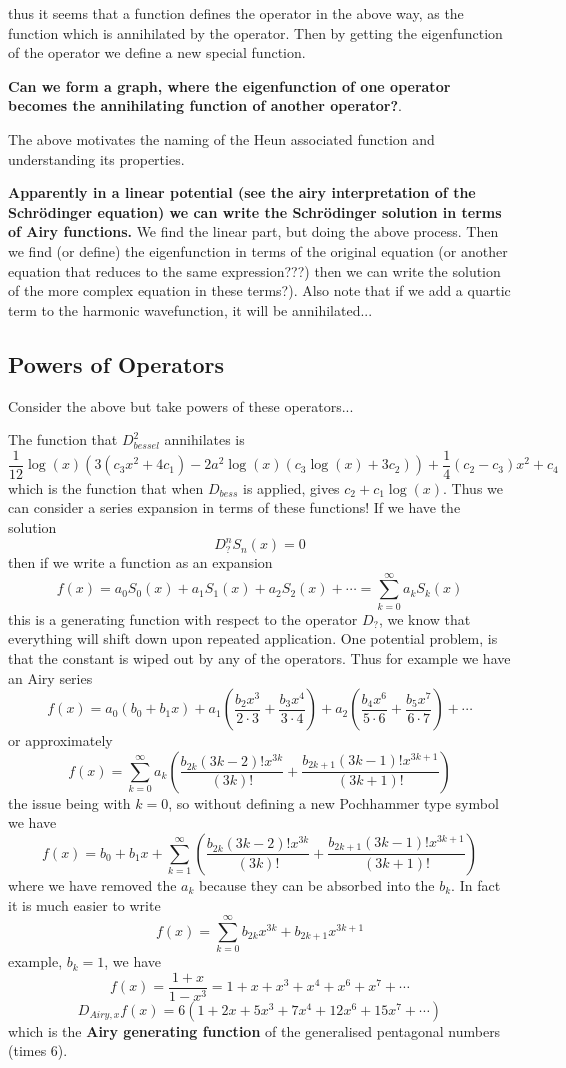 \documentclass{article}
\begin{document}
thus it seems that a function defines the operator in the above way, as the function which is annihilated by the operator. Then by getting the eigenfunction of the operator we define a new special function.

\textbf{Can we form a graph, where the eigenfunction of one operator becomes the annihilating function of another operator?}.

The above motivates the naming of the Heun associated function and understanding its properties.

\textbf{Apparently in a linear potential (see the airy interpretation of the Schrödinger equation) we can write the Schrödinger solution in terms of Airy functions.} We find the linear part, but doing the above process. Then we find (or define) the eigenfunction in terms of the original equation (or another equation that reduces to the same expression???) then we can write the solution of the more complex equation in these terms?). Also note that if we add a quartic term to the harmonic wavefunction, it will be annihilated...

\subsection{Powers of Operators}
Consider the above but take powers of these operators...

The function that $D^2_{bessel}$ annihilates is 
$$
 \frac{1}{12} \log (x) \left(3 \left(c_3 x^2+4 c_1\right)-2 a^2 \log (x) (c_3
    \log (x)+3 c_2)\right)+\frac{1}{4} (c_2-c_3) x^2+c_4
$$
which is the function that when $D_{bess}$ is applied, gives $c_2 + c_1 \log(x)$. Thus we can consider a series expansion in terms of these functions! If we have the solution 
$$
D^n_{?} S_n(x) = 0 
$$
then if we write a function as an expansion
$$
f(x) = a_0 S_0(x) + a_1 S_1(x) + a_2 S_2(x) + \cdots = \sum_{k=0}^\infty a_k S_k(x)
$$
this is a generating function with respect to the operator $D_?$, we know that everything will shift down upon repeated application.
One potential problem, is that the constant is wiped out by any of the operators. Thus for example we have an Airy series
$$
f(x) = a_0(b_0 + b_1 x) + a_1( \frac{b_2 x^3}{2 \cdot 3} + \frac{b_3 x^4}{3 \cdot 4}) + a_2\left( \frac{b_4 x^6}{5 \cdot 6} + \frac{b_5 x^7}{6 \cdot 7} \right) + \cdots 
$$
or approximately 
$$
f(x) = \sum_{k=0}^\infty a_k \left(\frac{b_{2k} (3k-2)! x^{3 k}}{(3k)!} + \frac{b_{2k+1} (3k-1)! x^{3k+1}}{(3k+1)!} \right)
$$
the issue being with $k=0$, so without defining a new Pochhammer type symbol we have
$$
f(x) = b_0 + b_1 x + \sum_{k=1}^\infty \left(\frac{b_{2k} (3k-2)! x^{3 k}}{(3k)!} + \frac{b_{2k+1} (3k-1)! x^{3k+1}}{(3k+1)!} \right)
$$
where we have removed the $a_k$ because they can be absorbed into the $b_k$. In fact it is much  easier  to write 
$$
f(x) = \sum_{k=0}^\infty b_{2k}x^{3 k} + b_{2k+1} x^{3k+1}
$$
example, $b_k=1$, we have 
$$
f(x) = \frac{1+x}{1-x^3} = 1 + x + x^3 + x^4 + x^6 + x^7 + \cdots
$$
$$
D_{Airy,x}f(x) = 6(1 + 2x + 5 x^3 + 7x^4 + 12 x^6 + 15 x^7 + \cdots)
$$
which is the \textbf{Airy generating function} of the generalised pentagonal numbers (times 6).
\end{document}
